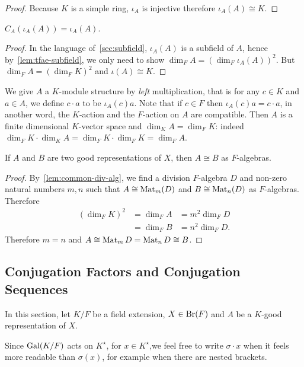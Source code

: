 \begin{proof}
  Because $K$ is a simple ring, $\iota_{A}$ is injective therefore $\iota_{A}(A)\cong K$.
\end{proof}

\begin{lemma}\label{lem:centralizer-range-good-rep}
  $C_{A}\left(\iota_{A}(A)\right) = \iota_{A}(A)$.
  \leanok
\end{lemma}
\begin{proof}
  In the language of~\cref{sec:subfield}, $\iota_{A}(A)$ is a subfield of $A$, hence by~\cref{lem:tfae-subfield}, we only need to show $\dim_{F}A = {\left(\dim_{F}\iota_{A}(A)\right)}^{2}$. But $\dim_{F}A={\left(\dim_{F}K\right)}^{2}$ and $\iota(A)\cong K$.
\end{proof}

\begin{construction}\label{con:good-rep-mod}
  We give $A$ a $K$-module structure by {\em left\/} multiplication, that is for any $c \in K$ and $a \in A$, we define $c\cdot a$ to be $\iota_{A}(c)a$. Note that if $c \in F$ then $\iota_{A}(c)a = c \cdot a$, in another word, the $K$-action and the $F$-action on $A$ are compatible. Then $A$ is a finite dimensional $K$-vector space and $\dim_{K}A=\dim_{F}K$: indeed $\dim_{F}K\cdot\dim_{K}A = \dim_{F}K\cdot \dim_{F}K = \dim_{F}A$.
  \leanok
\end{construction}

\begin{lemma}\label{lem:good-rep-iso}
  If $A$ and $B$ are two good representations of $X$, then $A \cong B$ as $F$-algebras.
  \leanok
\end{lemma}
\begin{proof}
  By~\cref{lem:common-div-alg}, we find a division $F$-algebra $D$ and non-zero natural numbers $m, n$ such that $A \cong \operatorname{Mat}_{m}(D)$ and $B \cong \operatorname{Mat}_{n}(D)$ as $F$-algebras. Therefore
  \[
    \begin{aligned}
      {\left(\dim_{F}K\right)}^{2} &= \dim_{F}A &= m^{2}\dim_{F}D \\
      &= \dim_{F}B &= n^{2}\dim_{F}D.
    \end{aligned}
  \]
  Therefore $m = n$ and $A \cong \operatorname{Mat}_{m}D =\operatorname{Mat}_{n}D\cong B$.
\end{proof}

\subsection{Conjugation Factors and Conjugation Sequences}
In this section, let $K/F$ be a field extension, $X \in \operatorname{Br}(F)$ and $A$ be a $K$-good representation of $X$.
\begin{remark}
  Since $\operatorname{Gal}(K/F)$ acts on $K^{\star}$, for $x\in K^{\star}$,we feel free to write $\sigma\cdot x$ when it feels more readable than $\sigma(x)$, for example when there are nested brackets.
\end{remark}


